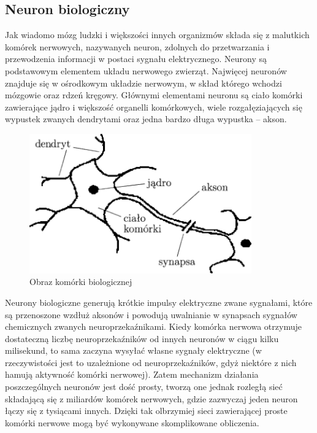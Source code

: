 \documentclass{article}
\begin{document}
\subsection{Neuron biologiczny}
Jak wiadomo mózg ludzki i większości innych organizmów składa się z malutkich komórek nerwowych, nazywanych neuron, zdolnych do przetwarzania i przewodzenia informacji w postaci sygnału elektrycznego. Neurony są podstawowym elementem układu nerwowego zwierząt. Najwięcej neuronów znajduje się w ośrodkowym układzie nerwowym, w skład którego wchodzi mózgowie oraz rdzeń kręgowy. \cite{neuroscience}
Głównymi elementami neuronu są ciało komórki zawierające jądro i większość organelli komórkowych, wiele rozgałęziających się wypustek zwanych dendrytami oraz jedna bardzo długa wypustka -- akson. \cite{geron}

\begin{figure}[H]
	\centering
	\includegraphics[width=\textwidth,height=6cm,keepaspectratio=true]{neuron_bio}
	\caption{
		Obraz komórki biologicznej \cite{neuron_bio}
	}
\end{figure}

Neurony biologiczne generują krótkie impulsy elektryczne zwane sygnałami, które są przenoszone wzdłuż aksonów i powodują uwalnianie w synapsach sygnałów chemicznych zwanych neuroprzekaźnikami. Kiedy komórka nerwowa otrzymuje dostateczną liczbę neuroprzekaźników od innych neuronów w ciągu kilku milisekund, to sama zaczyna wysyłać własne sygnały elektryczne (w rzeczywistości jest to uzależnione od neuroprzekaźników, gdyż niektóre z nich hamują aktywność komórki nerwowej). \cite{geron}
Zatem mechanizm działania poszczególnych neuronów jest dość prosty, tworzą one jednak rozległą sieć składającą się z miliardów komórek nerwowych, gdzie zazwyczaj jeden neuron łączy się z tysiącami innych. Dzięki tak olbrzymiej sieci zawierającej proste komórki nerwowe mogą być wykonywane skomplikowane obliczenia.
\end{document}
